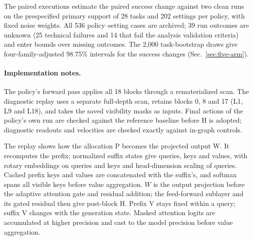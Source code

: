 The paired executions estimate the paired success change against two clean runs on the prespecified primary support of 28 tasks and 202 settings per policy, with fixed noise weights. All 536 policy--setting cases are archived; 39 run outcomes are unknown (25 technical failures and 14 that fail the analysis validation criteria) and enter bounds over missing outcomes. The 2,000 task-bootstrap draws give four-family-adjusted 98.75\% intervals for the success changes (Sec.~\ref{sec:five-arm}).

\paragraph{Implementation notes.}
The policy's forward pass applies all 18 blocks through a rematerialized scan. The diagnostic replay uses a separate full-depth scan, retains blocks 0, 8 and 17 (L1, L9 and L18), and takes the saved visibility masks as inputs. Final actions of the policy's own run are checked against the reference baseline before H is adopted; diagnostic readouts and velocities are checked exactly against in-graph controls.

The replay shows how the allocation P becomes the projected output W. It recomputes the prefix; normalized suffix states give queries, keys and values, with rotary embeddings on queries and keys and head-dimension scaling of queries. Cached prefix keys and values are concatenated with the suffix's, and softmax spans all visible keys before value aggregation. $W$ is the output projection before the adaptive attention gate and residual addition; the feed-forward sublayer and its gated residual then give post-block H. Prefix V stays fixed within a query; suffix V changes with the generation state. Masked attention logits are accumulated at higher precision and cast to the model precision before value aggregation.
